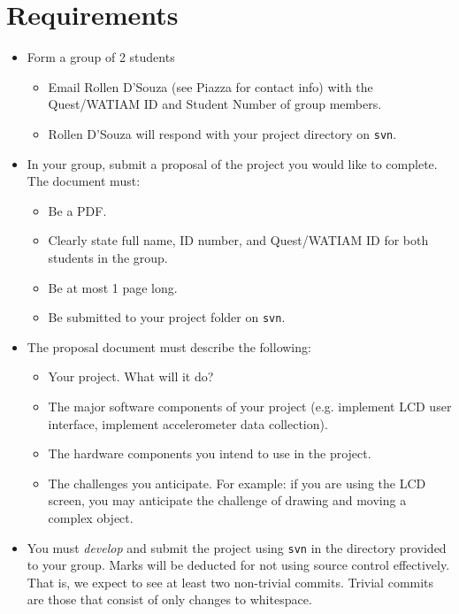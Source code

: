 \documentclass{article}
\begin{document}
\section*{Requirements}
\begin{itemize}
	\item{Form a group of 2 students}
		\begin{itemize}
			\item Email Rollen D'Souza (see Piazza for contact info) with the Quest/WATIAM ID and Student Number of group members.
			\item Rollen D'Souza will respond with your project directory on \texttt{svn}.
		\end{itemize}
	\item{In your group, submit a proposal of the project you would like to complete. The document must:}
		\begin{itemize}
			\item Be a PDF.
			\item Clearly state full name, ID number, and Quest/WATIAM ID for both students in the group.
			\item Be at most 1 page long.
			\item Be submitted to your project folder on \texttt{svn}.
		\end{itemize}
	\item{The proposal document must describe the following:}
		\begin{itemize}
			\item Your project. What will it do?
			\item The major software components of your project (e.g. implement LCD user interface, implement accelerometer data collection).
			\item The hardware components you intend to use in the project.
			\item The challenges you anticipate.  For example: if you are using the LCD screen, you may anticipate the challenge of drawing and moving a complex object.
		\end{itemize}
	\item{You must \emph{develop} and submit the project using \texttt{svn} in the directory provided to your group.  Marks will be deducted for not using source control effectively.  That is, we expect to see at least two non-trivial commits.  Trivial commits are those that consist of only changes to whitespace.}

\end{itemize}
\end{document}

